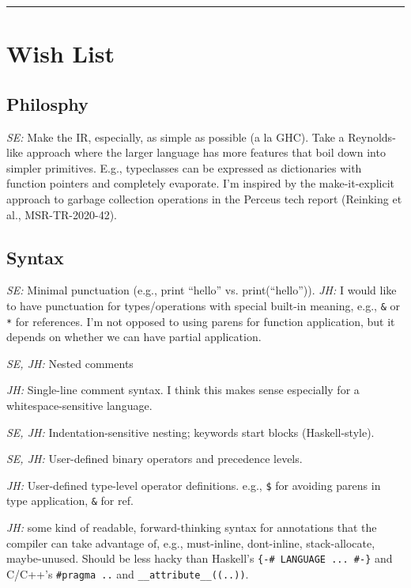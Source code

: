 \documentclass{article}
\begin{document}
\newpage

\hrule

\section{Wish List}

\subsection{Philosphy}

\textit{SE:} Make the IR, especially, as simple as possible (a la
GHC). Take a Reynolds-like approach where the larger language has more
features that boil down into simpler primitives.  E.g., typeclasses
can be expressed as dictionaries with function pointers and completely
evaporate.  I'm inspired by the make-it-explicit approach to garbage
collection operations in the Perceus tech report (Reinking et al.,
MSR-TR-2020-42).

\subsection{Syntax}

\textit{SE:} Minimal punctuation (e.g., print ``hello'' vs. print(``hello'')).
\textit{JH:} I would like to have punctuation for types/operations with special
built-in meaning, e.g., \verb|&| or \verb|*| for references. I'm not opposed to
using parens for function application, but it depends on whether we can have
partial application.

\textit{SE, JH:} Nested comments

\textit{JH:} Single-line comment syntax. I think this makes sense especially for
a whitespace-sensitive language.

\textit{SE, JH:} Indentation-sensitive nesting; keywords start blocks (Haskell-style).

\textit{SE, JH:} User-defined binary operators and precedence levels.

\textit{JH:} User-defined type-level operator definitions. e.g., \verb|$| for
avoiding parens in type application, \verb|&| for ref.

\textit{JH:} some kind of readable, forward-thinking syntax for annotations that
the compiler can take advantage of, e.g., must-inline, dont-inline,
stack-allocate, maybe-unused. Should be less hacky than Haskell's
\verb|{-# LANGUAGE ... #-}| and C/C++'s \verb|#pragma ..| and
\verb|__attribute__((..))|.
\end{document}
